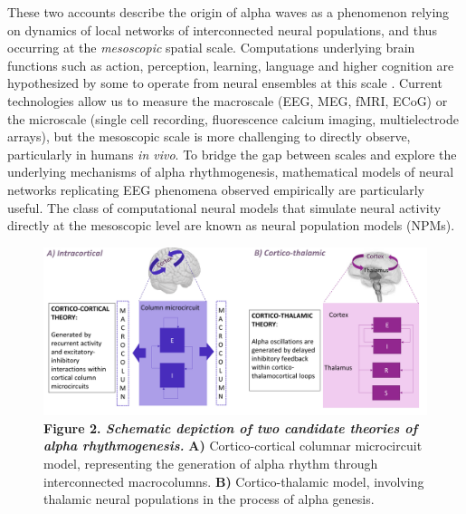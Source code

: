 \documentclass[12pt,twoside]{article}
\begin{document}
These two accounts describe the origin of alpha waves as a phenomenon relying on dynamics of local networks of interconnected neural populations, and thus occurring at the \textit{mesoscopic} spatial scale. Computations underlying brain functions such as action, perception, learning, language and higher cognition are hypothesized by some to operate from neural ensembles at this scale \citep{deco2008dynamic}. Current technologies allow us to measure the macroscale (EEG, MEG, fMRI, ECoG) or the microscale (single cell recording, fluorescence calcium imaging, multielectrode arrays), but the mesoscopic scale is more challenging to directly observe, particularly in humans \textit{in vivo}. To bridge the gap between scales and explore the underlying mechanisms of alpha rhythmogenesis, mathematical models of neural networks replicating EEG phenomena observed empirically are particularly useful. The class of computational neural models that simulate neural activity directly at the mesoscopic level are known as neural population models (NPMs). %
\begin{figure}[H]
    \centering
    \includegraphics[scale=0.45]{Images/Fig2__Theories.png}
    \caption*{\textbf{Figure 2. \textit{Schematic depiction of two candidate theories of alpha rhythmogenesis.}} \textbf{A)} Cortico-cortical columnar microcircuit model, representing the generation of alpha rhythm through interconnected macrocolumns. \textbf{B)} Cortico-thalamic model, involving thalamic neural populations in the process of alpha genesis.}
    \label{fig:Theories}
\end{figure}
\end{document}
